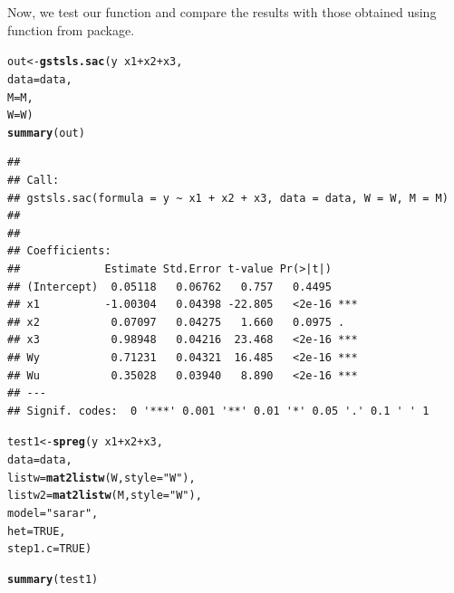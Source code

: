 \documentclass[english,12pt]{book}\usepackage[]{graphicx}\usepackage[]{xcolor}
\makeatletter
\newcommand{\hlnum}[1]{\textcolor[rgb]{0.686,0.059,0.569}{#1}}%
\newcommand{\hlsng}[1]{\textcolor[rgb]{0.192,0.494,0.8}{#1}}%
\newcommand{\hlopt}[1]{\textcolor[rgb]{0,0,0}{#1}}%
\newcommand{\hldef}[1]{\textcolor[rgb]{0.345,0.345,0.345}{#1}}%
\newcommand{\hlkwb}[1]{\textcolor[rgb]{0.69,0.353,0.396}{#1}}%
\newcommand{\hlkwc}[1]{\textcolor[rgb]{0.333,0.667,0.333}{#1}}%
\newcommand{\hlkwd}[1]{\textcolor[rgb]{0.737,0.353,0.396}{\textbf{#1}}}%
\newenvironment{kframe}{%
 \def\at@end@of@kframe{}%
 \ifinner\ifhmode%
  \def\at@end@of@kframe{\end{minipage}}%
  \begin{minipage}{\columnwidth}%
 \fi\fi%
 \def\FrameCommand##1{\hskip\@totalleftmargin \hskip-\fboxsep
 \colorbox{shadecolor}{##1}\hskip-\fboxsep
     \hskip-\linewidth \hskip-\@totalleftmargin \hskip\columnwidth}%
 \MakeFramed {\advance\hsize-\width
   \@totalleftmargin\z@ \linewidth\hsize
   \@setminipage}}%
 {\par\unskip\endMakeFramed%
 \at@end@of@kframe}
\newenvironment{knitrout}{}{} %
\makeatother
\begin{document}
Now, we test our function and compare the results with those obtained using  function from  package. 
\begin{knitrout}
\color{fgcolor}\begin{kframe}
\begin{alltt}
\hldef{out} \hlkwb{<-} \hlkwd{gstsls.sac}\hldef{(y} \hlopt{~} \hldef{x1} \hlopt{+} \hldef{x2} \hlopt{+} \hldef{x3,}
           \hlkwc{data} \hldef{= data,}
           \hlkwc{M} \hldef{= M,}
           \hlkwc{W} \hldef{= W)}
\hlkwd{summary}\hldef{(out)}
\end{alltt}
\begin{verbatim}
## 
## Call:
## gstsls.sac(formula = y ~ x1 + x2 + x3, data = data, W = W, M = M)
## 
## 
## Coefficients:
##             Estimate Std.Error t-value Pr(>|t|)    
## (Intercept)  0.05118   0.06762   0.757   0.4495    
## x1          -1.00304   0.04398 -22.805   <2e-16 ***
## x2           0.07097   0.04275   1.660   0.0975 .  
## x3           0.98948   0.04216  23.468   <2e-16 ***
## Wy           0.71231   0.04321  16.485   <2e-16 ***
## Wu           0.35028   0.03940   8.890   <2e-16 ***
## ---
## Signif. codes:  0 '***' 0.001 '**' 0.01 '*' 0.05 '.' 0.1 ' ' 1
\end{verbatim}
\end{kframe}
\end{knitrout}


\begin{knitrout}
\color{fgcolor}\begin{kframe}
\begin{alltt}
\hldef{test1} \hlkwb{<-} \hlkwd{spreg}\hldef{(y} \hlopt{~} \hldef{x1} \hlopt{+} \hldef{x2} \hlopt{+} \hldef{x3,}
               \hlkwc{data} \hldef{= data,}
               \hlkwc{listw} \hldef{=} \hlkwd{mat2listw}\hldef{(W,} \hlkwc{style} \hldef{=} \hlsng{"W"}\hldef{),}
               \hlkwc{listw2} \hldef{=} \hlkwd{mat2listw}\hldef{(M,} \hlkwc{style} \hldef{=} \hlsng{"W"}\hldef{),}
               \hlkwc{model} \hldef{=} \hlsng{"sarar"}\hldef{,}
               \hlkwc{het} \hldef{=} \hlnum{TRUE}\hldef{,}
               \hlkwc{step1.c} \hldef{=} \hlnum{TRUE}\hldef{)}
\end{alltt}


{\ttfamily\noindent\bfseries\color{errorcolor}{\#\# Error in dimnames(x) <- dn: length of 'dimnames' [1] not equal to array extent}}\begin{alltt}
\hlkwd{summary}\hldef{(test1)}
\end{alltt}


{\ttfamily\noindent\bfseries\color{errorcolor}{\#\# Error in h(simpleError(msg, call)): error in evaluating the argument 'object' in selecting a method for function 'summary': object 'test1' not found}}\end{kframe}
\end{knitrout}
\end{document}
